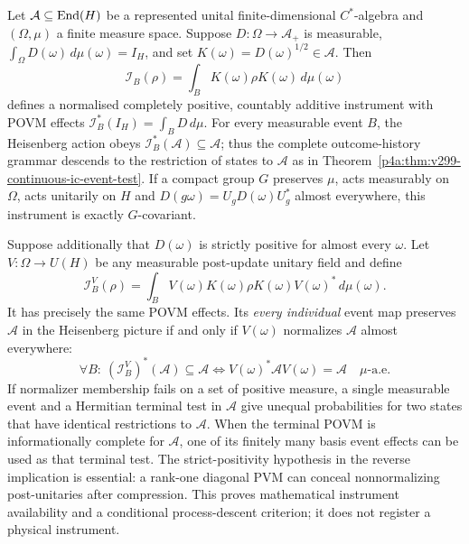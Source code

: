 \documentclass[12pt,a4paper]{article}
\begin{document}
\begin{theorem}
\label{p4a:thm:v300-covariant-root-instrument}
Let $\mathcal A\subseteq\operatorname{End}(H)$ be a represented unital
finite-dimensional $C^*$-algebra and $(\Omega,\mu)$ a finite
measure space. Suppose $D:\Omega\to\mathcal A_+$ is measurable,
$\int_\Omega D(\omega)\,d\mu(\omega)=I_H$, and set
$K(\omega)=D(\omega)^{1/2}\in\mathcal A$. Then
\[
 \mathcal I_B(\rho)=\int_B K(\omega)\rho K(\omega)\,d\mu(\omega)
\]
defines a normalised completely positive, countably additive
instrument with POVM effects $\mathcal I_B^*(I_H)=\int_B D\,d\mu$.
For every measurable event $B$, the Heisenberg action obeys
$\mathcal I_B^*(\mathcal A)\subseteq\mathcal A$; thus the complete
outcome-history grammar descends to the restriction of states to
$\mathcal A$ as in
Theorem~\ref{p4a:thm:v299-continuous-ic-event-test}.
If a compact group $G$ preserves $\mu$, acts measurably on $\Omega$,
acts unitarily on $H$ and $D(g\omega)=U_gD(\omega)U_g^*$ almost
everywhere, this instrument is exactly $G$-covariant.

Suppose additionally that $D(\omega)$ is strictly positive for
almost every $\omega$. Let $V:\Omega\to U(H)$ be any measurable
post-update unitary field and define
\[
 \mathcal I_B^V(\rho)=\int_B
 V(\omega)K(\omega)\rho K(\omega)V(\omega)^*\,d\mu(\omega).
\]
It has precisely the same POVM effects. Its \emph{every individual}
event map preserves $\mathcal A$ in the Heisenberg picture if and only
if $V(\omega)$ normalizes $\mathcal A$ almost everywhere:
\[
 \boxed{\ \forall B:\ (\mathcal I_B^V)^*(\mathcal A)\subseteq\mathcal A
 \iff V(\omega)^*\mathcal A V(\omega)=\mathcal A\quad\mu\text{-a.e.}\ }
\]
If normalizer membership fails on a set of positive measure, a single
measurable event and a Hermitian terminal test in $\mathcal A$ give
unequal probabilities for two states that have identical restrictions
to $\mathcal A$. When the terminal POVM is informationally complete
for $\mathcal A$, one of its finitely many basis event effects can
be used as that terminal test.
The strict-positivity hypothesis in the reverse implication is
essential: a rank-one diagonal PVM can conceal nonnormalizing
post-unitaries after compression.
This proves mathematical instrument availability and a conditional
process-descent criterion; it does not register a physical instrument.
\end{theorem}
\end{document}
